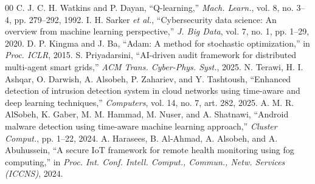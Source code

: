 \documentclass[conference,a4paper]{IEEEtran}
\begin{document}
\begin{thebibliography}{00}
 C. J. C. H. Watkins and P. Dayan, ``Q-learning,'' \textit{Mach. Learn.}, vol. 8, no. 3--4, pp. 279--292, 1992.
 I. H. Sarker \textit{et al.}, ``Cybersecurity data science: An overview from machine learning perspective,'' \textit{J. Big Data}, vol. 7, no. 1, pp. 1--29, 2020.
 D. P. Kingma and J. Ba, ``Adam: A method for stochastic optimization,'' in \textit{Proc. ICLR}, 2015.
 S. Priyadarsini, ``AI-driven audit framework for distributed multi-agent smart grids,'' \textit{ACM Trans. Cyber-Phys. Syst.}, 2025.
 N. Terawi, H. I. Ashqar, O. Darwish, A. Alsobeh, P. Zahariev, and Y. Tashtoush, ``Enhanced detection of intrusion detection system in cloud networks using time-aware and deep learning techniques,'' \textit{Computers}, vol. 14, no. 7, art. 282, 2025.
 A. M. R. AlSobeh, K. Gaber, M. M. Hammad, M. Nuser, and A. Shatnawi, ``Android malware detection using time-aware machine learning approach,'' \textit{Cluster Comput.}, pp. 1--22, 2024.
 A. Harasees, B. Al-Ahmad, A. Alsobeh, and A. Abuhussein, ``A secure IoT framework for remote health monitoring using fog computing,'' in \textit{Proc. Int. Conf. Intell. Comput., Commun., Netw. Services (ICCNS)}, 2024.
\end{thebibliography}
\end{document}
